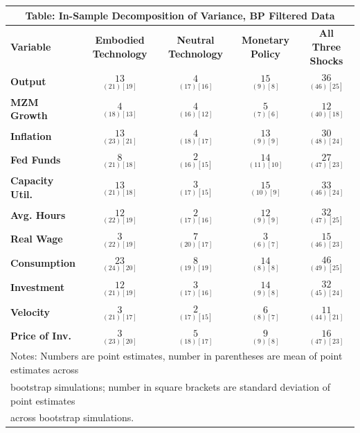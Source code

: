 \documentclass{article}
\begin{document}
 \begin{tabular}{|l|c|@{}c|c|@{}c|} 
 \hline 
 \multicolumn{5}{|c|}{\textbf{Table: In-Sample Decomposition of Variance, BP Filtered Data}} \\ \hline 
 \textbf{Variable} & \textbf{Embodied Technology} & \textbf{Neutral Technology} & \textbf{%
 Monetary Policy} & \textbf{All Three Shocks} \\ \hline\hline 
 \textbf{Output} & $\underset{( 21)[ 19]}{ 13}$ & $\underset{( 17)[ 16]}{  4}$ & $\underset{(  9)[  8]}{ 15}$ & $\underset{( 46)[ 25]}{ 36}$ \\ \hline 
 \textbf{MZM Growth} & $\underset{( 18)[ 13]}{  4}$ & $\underset{( 16)[ 12]}{  4}$ & $\underset{(  7)[  6]}{  5}$ & $\underset{( 40)[ 18]}{ 12}$ \\ \hline 
 \textbf{Inflation} & $\underset{( 23)[ 21]}{ 13}$ & $\underset{( 18)[ 17]}{  4}$ & $\underset{(  9)[  9]}{ 13}$ & $\underset{( 48)[ 24]}{ 30}$ \\ \hline 
 \textbf{Fed Funds} & $\underset{( 21)[ 18]}{  8}$ & $\underset{( 16)[ 15]}{  2}$ & $\underset{( 11)[ 10]}{ 14}$ & $\underset{( 47)[ 23]}{ 27}$ \\ \hline 
 \textbf{Capacity Util.} & $\underset{( 21)[ 18]}{ 13}$ & $\underset{( 17)[ 15]}{  3}$ & $\underset{( 10)[  9]}{ 15}$ & $\underset{( 46)[ 24]}{ 33}$ \\ \hline 
 \textbf{Avg. Hours} & $\underset{( 22)[ 19]}{ 12}$ & $\underset{( 17)[ 16]}{  2}$ & $\underset{(  9)[  9]}{ 12}$ & $\underset{( 47)[ 25]}{ 32}$ \\ \hline 
 \textbf{Real Wage} & $\underset{( 22)[ 19]}{  3}$ & $\underset{( 20)[ 17]}{  7}$ & $\underset{(  6)[  7]}{  3}$ & $\underset{( 46)[ 23]}{ 15}$ \\ \hline 
 \textbf{Consumption} & $\underset{( 24)[ 20]}{ 23}$ & $\underset{( 19)[ 19]}{  8}$ & $\underset{(  8)[  8]}{ 14}$ & $\underset{( 49)[ 25]}{ 46}$ \\ \hline 
 \textbf{Investment} & $\underset{( 21)[ 19]}{ 12}$ & $\underset{( 17)[ 16]}{  3}$ & $\underset{(  9)[  8]}{ 14}$ & $\underset{( 45)[ 24]}{ 32}$ \\ \hline 
 \textbf{Velocity} & $\underset{( 21)[ 17]}{  3}$ & $\underset{( 17)[ 15]}{  2}$ & $\underset{(  8)[  7]}{  6}$ & $\underset{( 44)[ 21]}{ 11}$ \\ \hline 
 \textbf{Price of Inv.} & $\underset{( 23)[ 20]}{  3}$ & $\underset{( 18)[ 17]}{  5}  $ & $\underset{(  9)[  8]}{  9}$ & $\underset{( 47)[ 23]}{ 16}$ \\ \hline 
 \multicolumn{5}{|l|}{Notes: Numbers are point estimates, number in 
 parentheses are mean of point estimates across} \\ \hline 
 \multicolumn{5}{|l|}{bootstrap simulations; number in square brackets are 
 standard deviation of point estimates} \\ \hline 
 \multicolumn{5}{|l|}{across bootstrap simulations.} \\ \hline 
 \end{tabular} 
\end{document}
